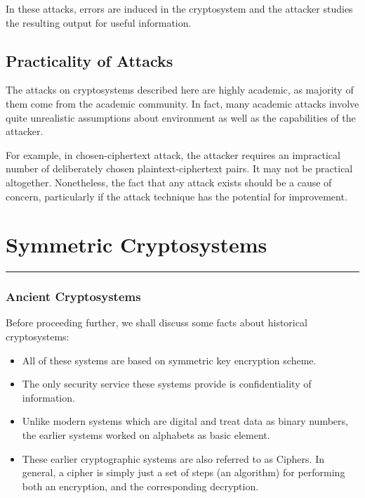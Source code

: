 \documentclass[british]{report}
\begin{document}
In these attacks, errors are induced in the cryptosystem and the attacker
studies the resulting output for useful information.

\section{Practicality of Attacks}

The attacks on cryptosystems described here are highly academic, as
majority of them come from the academic community. In fact, many academic
attacks involve quite unrealistic assumptions about environment as
well as the capabilities of the attacker.

For example, in chosen-ciphertext attack, the attacker requires an
impractical number of deliberately chosen plaintext-ciphertext pairs.
It may not be practical altogether. Nonetheless, the fact that any
attack exists should be a cause of concern, particularly if the attack
technique has the potential for improvement.

\vfill{}

\pagebreak{}

\chapter{Symmetric Cryptosystems}
\begin{center}
	\rule[0.5ex]{450bp}{0.75pt}
	\par\end{center}

\subsection{Ancient Cryptosystems}

Before proceeding further, we shall discuss some facts about historical
cryptosystems:
\begin{itemize}
	\item All of these systems are based on symmetric key encryption scheme.
	\item The only security service these systems provide is confidentiality
	      of information.
	\item Unlike modern systems which are digital and treat data as binary numbers,
	      the earlier systems worked on alphabets as basic element.
	\item These earlier cryptographic systems are also referred to as Ciphers.
	      In general, a cipher is simply just a set of steps (an algorithm)
	      for performing both an encryption, and the corresponding decryption.
\end{itemize}
\end{document}

